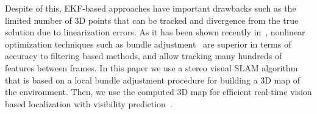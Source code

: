 Despite of this, EKF-based approaches have important drawbacks such as
the limited number of 3D points that can be tracked and divergence
from the true solution due to linearization errors. As it has been
shown recently in~\cite{Strasdat10icra}, nonlinear optimization
techniques such as bundle adjustment~\cite{Mouragnon09ivc} are
superior in terms of accuracy to filtering based methods, and allow
tracking many hundreds of features between frames. In this paper we
use a stereo visual SLAM algorithm that is based on a local bundle
adjustment procedure for building a 3D map of the environment. Then,
we use the computed 3D map for efficient real-time vision based
localization with visibility
prediction~\cite{Alcantarilla10icra,Alcantarilla11icra}.

